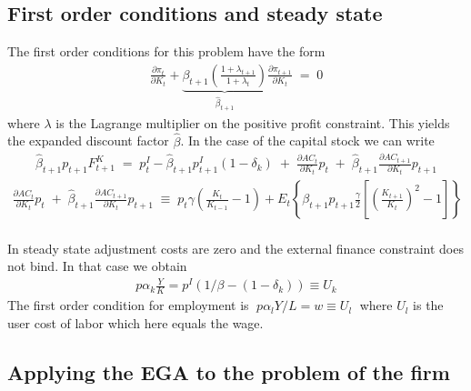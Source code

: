 \documentclass[danish]{article}
\begin{document}
\subsection{First order conditions and steady state}

The first order conditions for this problem have the form
\begin{gather*}
\frac{\partial\pi_{t}}{\partial K_{t}}+\underbrace{\beta_{t+1}\left(\frac{1+\lambda_{t+1}}{1+\lambda_t}\right)}_{\hat{\beta}_{t+1}}\frac{\partial\pi_{t+1}}{\partial K_{t}} \; =\; 0
\end{gather*}
where $\lambda$ is the Lagrange multiplier on the positive profit constraint. This yields the expanded discount factor $\hat{\beta}$. In the case of the capital stock we can write
\begin{gather*}
\hat{\beta}_{t+1}p_{t+1}F_{t+1}^{K}\;=\;p_{t}^{I}-\hat{\beta}_{t+1}p_{t+1}^{I}\left(1-\delta_{k}\right)\; +\; \frac{\partial AC_{t}}{\partial K_{t}}p_{t} \; +\; \hat{\beta}_{t+1}\frac{\partial AC_{t+1}}{\partial K_{t}}p_{t+1}
\end{gather*}
\begin{gather*}
\frac{\partial AC_{t}}{\partial K_{t}}p_{t} \; +\; \hat{\beta}_{t+1}\frac{\partial AC_{t+1}}{\partial K_{t}}p_{t+1} \; \equiv\; p_t \gamma\left(\frac{K_{t}}{K_{t-1}}-1\right)+E_{t}\left\{ \beta_{t+1} p_{t+1}\frac{\gamma}{2}\left[\left(\frac{K_{t+1}}{K_{t}}\right)^{2}-1\right]\right\} 
\end{gather*}\\
In steady state adjustment costs are zero and the external finance constraint does not bind. In that case we obtain
\begin{gather*}
p \alpha_k \frac{Y}{K} = p^I(1/\beta - (1-\delta_k)) \equiv U_{k}   
\end{gather*}
The first order condition for employment is $\; p \alpha_l Y/L = w  \equiv U_l \;$ where $U_l$ is the user cost of labor which here equals the wage. 


\subsection{Applying the EGA to the problem of the firm}
\end{document}
